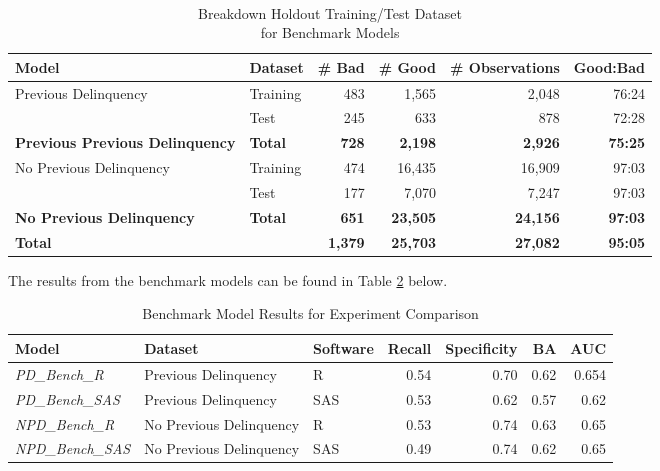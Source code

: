 \begin{table}[H]
	\centering\
	\resizebox{\textwidth}{!}
	{
		\begin{tabular}{l l r r r r}
			\hline
			\textbf{Model} &  \textbf{Dataset} & \textbf{\# Bad} & \textbf{\# Good} & \textbf{\# Observations} & \textbf{Good:Bad} \\
			\hline
			Previous Delinquency & Training       & 483 & 1,565 & 2,048 & 76:24\\
			          & Test & 245 & 633 & 878 & 72:28\\\hline
			\textbf{Previous Previous Delinquency}     & \textbf{Total} & \textbf{728} & \textbf{2,198} & \textbf{2,926} & \textbf{75:25} \\
			\hline
			No Previous Delinquency & Training & 474 & 16,435 & 16,909 & 97:03 \\ 
			          & Test & 177 & 7,070 & 7,247 & 97:03 	\\\hline
			\textbf{No Previous Delinquency}     & \textbf{Total} & \textbf{651} & \textbf{23,505} & \textbf{24,156} & \textbf{97:03} \\
			\hline
			\textbf{Total } 	&     	     & \textbf{1,379} & \textbf{25,703} & \textbf{27,082} & \textbf{95:05}\\ \hline
		\end{tabular}
	}
	\caption{Breakdown Holdout Training/Test Dataset \\for Benchmark Models}
	\label{table:benchmark_holdout_train_test}
\end{table}

The results from the benchmark models can be found in Table \ref{table:benchmodel} below.

\begin{table}[H]
	\centering
	\resizebox{\textwidth}{!}
	{\footnotesize
		\begin{tabular}{l l l r r r r}
			\hline
			\textbf{Model} & \textbf{Dataset} & \textbf{Software} & \textbf{Recall} & \textbf{Specificity} & \textbf{BA} & \textbf{AUC}  \\ \hline
			\textit{PD\_Bench\_R} & Previous Delinquency & R & 0.54 & 0.70 & 0.62 & 0.654   \\ 
			\textit{PD\_Bench\_SAS} & Previous Delinquency & SAS & 0.53 & 0.62 & 0.57 & 0.62   \\ \hline
			\textit{NPD\_Bench\_R} & No Previous Delinquency & R & 0.53 & 0.74 & 0.63 & 0.65   \\ 
			\textit{NPD\_Bench\_SAS} & No Previous Delinquency & SAS & 0.49 & 0.74 & 0.62 & 0.65   \\ \hline
		\end{tabular}
	}
	\caption{Benchmark Model Results for Experiment Comparison}
	\label{table:benchmodel}
\end{table}

